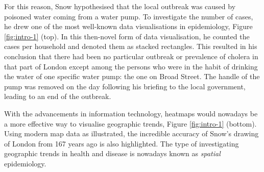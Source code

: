 \documentclass[
]{book}
\begin{document}
For this reason, Snow hypothesised that the local outbreak was caused by poisoned water coming from a water pump. To investigate the number of cases, he drew one of the most well-known data visualisations in epidemiology, Figure \ref{fig:intro-1} (top). In this then-novel form of data visualisation, he counted the cases per household and denoted them as stacked rectangles. This resulted in his conclusion that there had been no particular outbreak or prevalence of cholera in that part of London except among the persons who were in the habit of drinking the water of one specific water pump: the one on Broad Street. The handle of the pump was removed on the day following his briefing to the local government, leading to an end of the outbreak.

With the advancements in information technology, heatmaps would nowadays be a more effective way to visualise geographic trends, Figure \ref{fig:intro-1} (bottom). Using modern map data as illustrated, the incredible accuracy of Snow's drawing of London from 167 years ago is also highlighted. The type of investigating geographic trends in health and disease is nowadays known as \emph{spatial} epidemiology.
\end{document}
